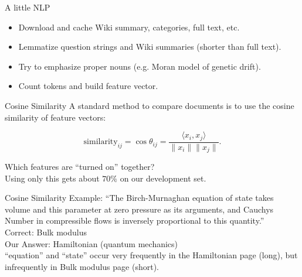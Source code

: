 \documentclass{beamer}
\begin{document}
\begin{frame}{A little NLP}
   \begin{itemize}
      \item Download and cache Wiki summary, categories, full text, etc.
      \item Lemmatize question strings and Wiki summaries (shorter than full text).
      \item Try to emphasize proper nouns (e.g. {\color{blue} Moran model} of genetic drift).
      \item Count tokens and build feature vector.
   \end{itemize}
\end{frame}

\begin{frame}{Cosine Similarity}
  A standard method to compare documents is to use the cosine similarity of feature vectors:

  \[ \text{similarity}_{ij} = \cos\theta_{ij} = \dfrac{\langle x_i, x_j\rangle}{\|x_i\| \|x_j\|}. \] 

  Which features are ``turned on'' together?\\

  Using only this gets about $70\%$ on our development set.
\end{frame}


\begin{frame}{Cosine Similarity}
   Example: ``The Birch-Murnaghan equation of state takes volume and this parameter at zero pressure as its arguments, and Cauchys Number in compressible flows is inversely proportional to this quantity.''\\[1em]
   {\color{green}Correct}: Bulk modulus\\
   {\color{red}Our Answer}: Hamiltonian (quantum mechanics)\\[1em]

   ``equation'' and ``state'' occur very frequently in the Hamiltonian page (long), but infrequently in Bulk modulus page (short).\\
\end{frame}
\end{document}
